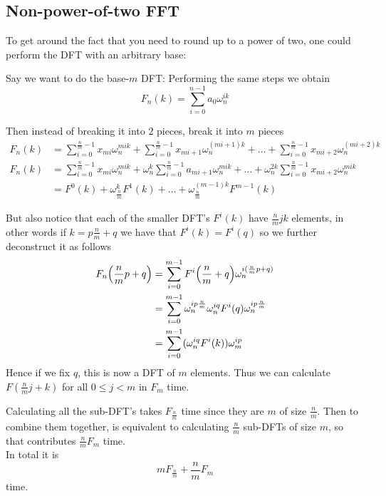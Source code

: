 \subsection{Non-power-of-two FFT}

To get around the fact that you need to round up to a power of two, one could perform the DFT with an arbitrary base:

Say we want to do the base-$m$ DFT:
Performing the same steps we obtain
\[
    F_n(k) = \sum^{n-1}_{i=0} a_0\omega_n^{ik} 
\]

Then instead of breaking it into $2$ pieces, break it into $m$ pieces
\begin{align*}
    F_n(k) &= \sum^{\frac{n}{m}-1}_{i=0} x_{mi}\omega_n^{mik} + \sum^{\frac{n}{m}-1}_{i=0} x_{mi+1}\omega_n^{(mi+1)k} + \ldots + \sum^{\frac{n}{m}-1}_{i=0} x_{mi+2}\omega_n^{(mi+2)k}\\
    F_n(k) &= \sum^{\frac{n}{m}-1}_{i=0} x_{mi}\omega_n^{mik} + \omega_n^k\sum^{\frac{n}{m}-1}_{i=0} a_{mi+1}\omega_n^{mik} + \ldots +  \omega_n^{2k}\sum^{\frac{n}{m}-1}_{i=0} x_{mi+2}\omega_n^{mik}\\
    &= F^0(k) + \omega_{\frac{n}{m}}^k F^1(k) + \ldots + \omega_{\frac{n}{m}}^{(m-1)k} F^{m-1}(k)
\end{align*}

But also notice that each of the smaller DFT's $F^i(k)$ have $\frac{n}{m}jk$ elements, in other words if $k = p\frac{n}{m} + q$ we have that $F^i(k) = F^i(q)$ so we further deconstruct it as follows
\begin{align*}
    F_n\bb{\frac{n}{m}p + q} &= \sum^{m-1}_{i=0} F^i\bb{\frac{n}{m} + q}\omega^{i(\frac{n}{m}p + q)}_n\\
    &= \sum^{m-1}_{i=0} \omega^{ip\frac{n}{m}}_n \omega_n^{iq} F^i(q)\omega^{ip\frac{n}{m}}_n\\
    &= \sum^{m-1}_{i=0} (\omega^{iq}_n F^i(k))\omega^{ip}_m\\
\end{align*}
Hence if we fix $q$, this is now a DFT of $m$ elements. Thus we can calculate $F(\frac{n}{m}j + k)$ for all $0 \leq j < m$ in $F_m$ time.

Calculating all the sub-DFT's takes $F_{\frac{n}{m}}$ time since they are $m$ of size $\frac{n}{m}$. Then to combine them together, is equivalent to calculating $\frac{n}{m}$ sub-DFTs of size $m$, so that contributes $\frac{n}{m}F_{m}$ time.\\
In total it is 
\[
    mF_{\frac{n}{m}} + \frac{n}{m}F_m    
\]
time.

